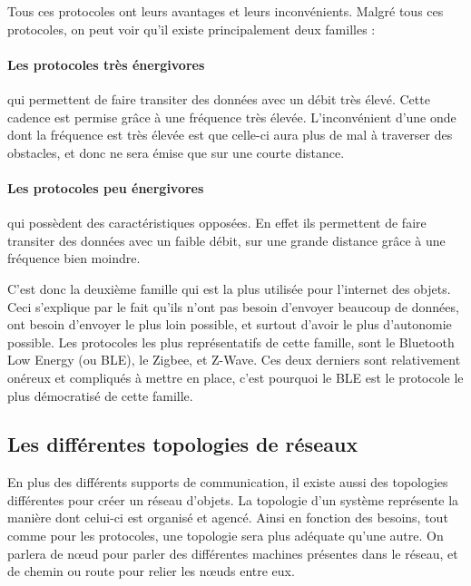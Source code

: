 Tous ces protocoles ont leurs avantages et leurs inconvénients. Malgré tous ces protocoles, on peut voir qu'il existe principalement deux familles :

\paragraph{Les protocoles très énergivores}qui permettent de faire transiter des données avec un débit très élevé. Cette cadence est permise grâce à une fréquence très élevée. L'inconvénient d'une onde dont la fréquence est très élevée est que celle-ci aura plus de mal à traverser des obstacles, et donc ne sera émise que sur une courte distance.

\paragraph{Les protocoles peu énergivores}qui possèdent des caractéristiques opposées. En effet ils permettent de faire transiter des données avec un faible débit, sur une grande distance grâce à une fréquence bien moindre.

C'est donc la deuxième famille qui est la plus utilisée pour l'internet des objets. Ceci s'explique par le fait qu'ils n'ont pas besoin d'envoyer beaucoup de données, ont besoin d'envoyer le plus loin possible, et surtout d'avoir le plus d'autonomie possible. Les protocoles les plus représentatifs de cette famille, sont le Bluetooth Low Energy (ou BLE), le Zigbee, et Z-Wave. Ces deux derniers sont relativement onéreux et compliqués à mettre en place, c'est pourquoi le BLE est le protocole le plus démocratisé de cette famille.

	\subsection{Les différentes topologies de réseaux}
En plus des différents supports de communication, il existe aussi des topologies différentes pour créer un 
réseau d'objets. La topologie d'un système représente la manière dont celui-ci est organisé et agencé. Ainsi 
en fonction des besoins, tout comme pour les protocoles, une topologie sera plus adéquate qu'une autre. On 
parlera de nœud pour parler des différentes machines présentes dans le réseau, et de chemin ou route pour 
relier les nœuds entre eux.

